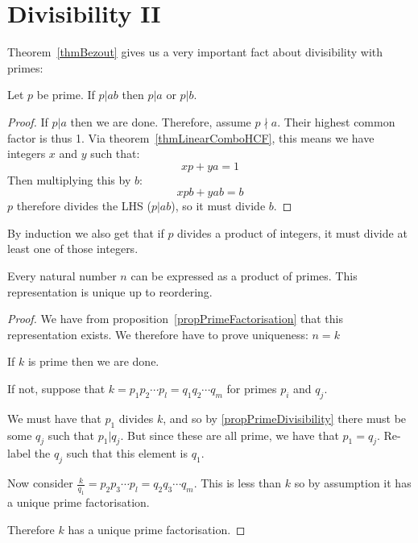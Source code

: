 \documentclass[../Main.tex]{subfiles}
\begin{document}
\section{Divisibility II}
Theorem~\ref{thmBezout} gives us a very important fact about divisibility with primes:
\begin{proposition}
    Let $p$ be prime. If $p | ab$ then $p | a$ or $p | b$.\label{propPrimeDivisibility}
\end{proposition}
\begin{proof}
    If $p | a$ then we are done. Therefore, assume $p \nmid a$. Their highest common factor is thus 1. Via theorem~\ref{thmLinearComboHCF}, this means we have integers $x$ and $y$ such that:
    \begin{equation*}
        x p + y a = 1
    \end{equation*}
    Then multiplying this by $b$:
    \begin{equation*}
        x p b + y a b = b
    \end{equation*}
    $p$ therefore divides the LHS ($p | ab$), so it must divide $b$.
\end{proof}
\begin{remark}
    By induction we also get that if $p$ divides a product of integers, it must divide at least one of those integers.
\end{remark}
\begin{theorem}
    Every natural number $n$ can be expressed as a product of primes. This representation is unique up to reordering.
    \label{thmFundamentalArith}
\end{theorem}
\begin{proof}
    We have from proposition~\ref{propPrimeFactorisation} that this representation exists. We therefore have to prove uniqueness:
    {$n = k$}{
        If $k$ is prime then we are done.\par
        If not, suppose that $k = p_1 p_2 \cdots p_l = q_1 q_2 \cdots q_m$ for primes $p_i$ and $q_j$.\par
        We must have that $p_1$ divides $k$, and so by \ref{propPrimeDivisibility} there must be some $q_j$ such that $p_1 | q_j$. But since these are all prime, we have that $p_1 = q_j$. Re-label the $q_j$ such that this element is $q_1$.\par
        Now consider $\frac{k}{q_1} = p_2 p_3 \cdots p_l = q_2 q_3 \cdots q_m$. This is less than $k$ so by assumption it has a unique prime factorisation.\par
        Therefore $k$ has a unique prime factorisation.
    }
\end{proof}
\end{document}
